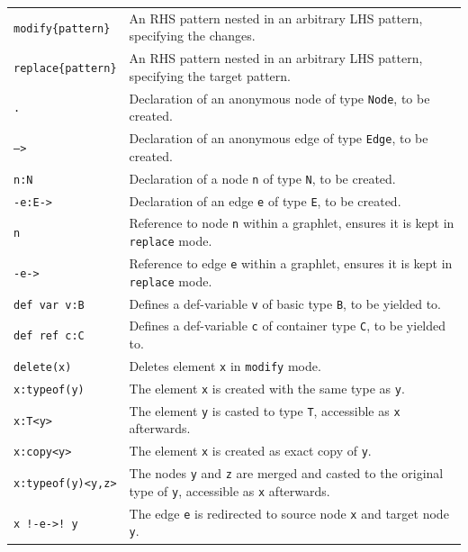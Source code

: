 
\begin{table}[htbp]
\begin{minipage}{\linewidth} \renewcommand{\footnoterule}{} 
\begin{tabularx}{\linewidth}{|lX|}
\hline
\texttt{modify\{pattern\}}	& An RHS pattern nested in an arbitrary LHS pattern, specifying the changes. \\
\texttt{replace\{pattern\}}	& An RHS pattern nested in an arbitrary LHS pattern, specifying the target pattern. \\
\hline
\texttt{.}	& Declaration of an anonymous node of type \texttt{Node}, to be created. \\
\texttt{-->}	& Declaration of an anonymous edge of type \texttt{Edge}, to be created. \\
\texttt{n:N} & Declaration of a node \texttt{n} of type \texttt{N}, to be created.\\
\texttt{-e:E->} & Declaration of an edge \texttt{e} of type \texttt{E}, to be created.\\
\texttt{n} & Reference to node \texttt{n} within a graphlet, ensures it is kept in \texttt{replace} mode.\\
\texttt{-e->} & Reference to edge \texttt{e} within a graphlet, ensures it is kept in \texttt{replace} mode.\\
\texttt{def var v:B}	& Defines a def-variable \texttt{v} of basic type \texttt{B}, to be yielded to.\\
\texttt{def ref c:C}	& Defines a def-variable \texttt{c} of container type \texttt{C}, to be yielded to.\\
\texttt{delete(x)} & Deletes element \texttt{x} in \texttt{modify} mode.\\
\hline
\texttt{x:typeof(y)} & The element \texttt{x} is created with the same type as \texttt{y}.\\
\texttt{x:T<y>} & The element \texttt{y} is casted to type \texttt{T}, accessible as \texttt{x} afterwards.\\
\texttt{x:copy<y>} & The element \texttt{x} is created as exact copy of \texttt{y}.\\
\texttt{x:typeof(y)<y,z>} & The nodes \texttt{y} and \texttt{z} are merged and casted to the original type of \texttt{y}, accessible as \texttt{x} afterwards.\\
\texttt{x !-e->! y} & The edge \texttt{e} is redirected to source node \texttt{x} and target node \texttt{y}.\\

\end{tabularx}
\end{minipage}
\end{table}

